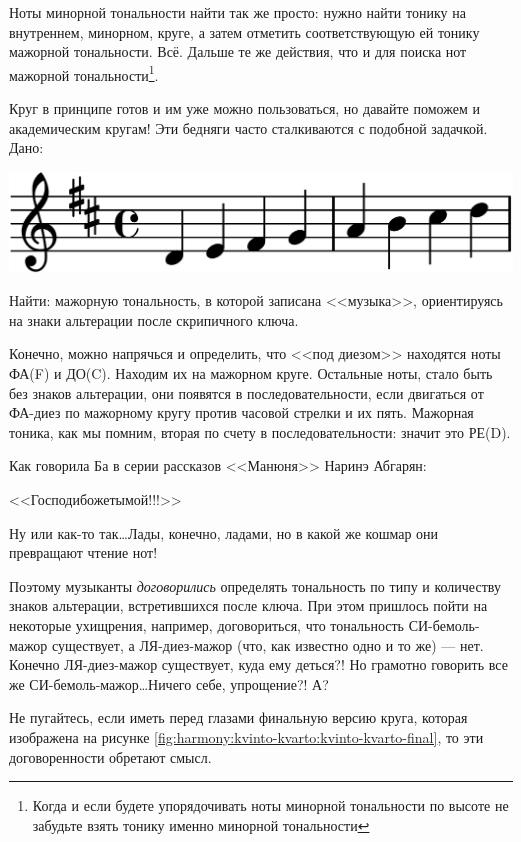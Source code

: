 Ноты минорной тональности найти так же просто: нужно найти тонику на внутреннем, минорном, круге, а затем отметить соответствующую ей тонику мажорной тональности. Всё. Дальше те же действия, что и для поиска нот мажорной тональности\footnote{Когда и если будете упорядочивать ноты минорной тональности по высоте не забудьте взять тонику именно минорной тональности}.

Круг в принципе готов и им уже можно пользоваться, но давайте поможем и академическим кругам! Эти бедняги часто сталкиваются с подобной задачкой. Дано:

\begin{center}    
    \includegraphics{fig/kvinto-kvarto/tonality-d-maj}
\end{center}

Найти: мажорную тональность, в которой записана <<музыка>>, ориентируясь на знаки альтерации после скрипичного ключа.

Конечно, можно напрячься и определить, что <<под диезом>> находятся ноты ФА(F) и ДО(C). Находим их на мажорном круге. Остальные ноты, стало быть без знаков альтерации, они появятся в последовательности, если двигаться от ФА-диез по мажорному кругу против часовой стрелки и их пять. Мажорная тоника, как мы помним, вторая по счету в последовательности: значит это РЕ(D).

Как говорила Ба в серии рассказов <<Манюня>> Наринэ Абгарян: 
\begin{center}
<<Господибожетымой!!!>> 
\end{center}

Ну или как-то так\ldots Лады, конечно, ладами, но в какой же кошмар они превращают чтение нот!

Поэтому музыканты \emph{договорились} определять тональность по типу и количеству знаков альтерации, встретившихся после ключа. При этом пришлось пойти на некоторые ухищрения, например, договориться, что тональность СИ-бемоль-мажор существует, а ЛЯ-диез-мажор (что, как известно одно и то же) --- нет. Конечно ЛЯ-диез-мажор существует, куда ему деться?! Но грамотно говорить все же СИ-бемоль-мажор\ldots Ничего себе, упрощение?! А?

Не пугайтесь, если иметь перед глазами финальную версию круга, которая изображена на рисунке \ref{fig:harmony:kvinto-kvarto:kvinto-kvarto-final}, то эти договоренности обретают смысл.

